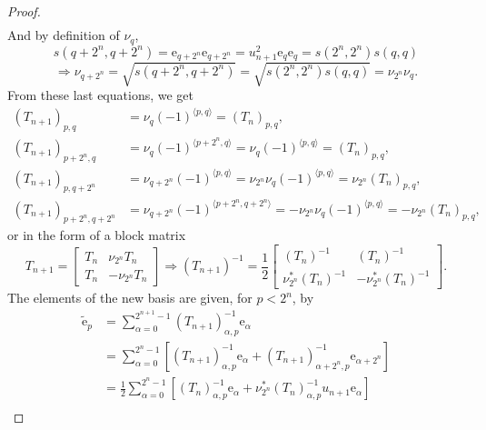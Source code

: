 \documentclass[10pt,a4paper]{amsart}
\begin{document}
\begin{proof}
\begin{equation}
\begin{aligned}
        \end{aligned}
    \end{equation}
    And by definition of $\nu_q$,
    $$ s(q+2^n, q+2^n) = \mathrm e_{q+2^n} \mathrm e_{q+2^n} = u_{n+1}^2 \mathrm e_q \mathrm e_q = s(2^n, 2^n) s(q,q) $$
    \begin{equation}
        \label{multiperplex and multicomplex diagonal basis theorem : elements nu}
        \Rightarrow \nu_{q+2^n} = \sqrt{s(q+2^n, q+2^n)} = \sqrt{s(2^n, 2^n) s(q,q)} = \nu_{2^n} \nu_q.
    \end{equation}
    From these last equations, we get
    $$
        \begin{aligned}
            (T_{n+1})_{p,q} &= \nu_q (-1)^{\langle p,q\rangle} = (T_n)_{p,q},\\
            (T_{n+1})_{p+2^n,q} &= \nu_q (-1)^{\langle p+2^n,q\rangle} = \nu_q (-1)^{\langle p,q\rangle} = (T_n)_{p,q},\\
            (T_{n+1})_{p,q+2^n} &= \nu_{q+2^n} (-1)^{\langle p,q\rangle} = \nu_{2^n}\nu_q (-1)^{\langle p,q\rangle} = \nu_{2^n}(T_n)_{p,q},\\
            (T_{n+1})_{p+2^n,q+2^n} &= \nu_{q+2^n} (-1)^{\langle p+2^n,q+2^n\rangle} = -\nu_{2^n}\nu_q (-1)^{\langle p,q\rangle} = -\nu_{2^n}(T_n)_{p,q},
        \end{aligned}
    $$
    or in the form of a block matrix
    \begin{equation}
        T_{n+1} = \begin{bmatrix}
            T_n & \nu_{2^n} T_n\\
            T_n & - \nu_{2^n} T_n
        \end{bmatrix} \Rightarrow (T_{n+1})^{-1} = \frac{1}{2} \begin{bmatrix}
            (T_n)^{-1} & (T_n)^{-1}\\
            \nu^*_{2^n} (T_n)^{-1} & - \nu^*_{2^n} (T_n)^{-1}
        \end{bmatrix}.
    \end{equation}
    The elements of the new basis are given, for $p<2^n$, by
    $$ \begin{aligned}
        \tilde{\mathrm e}_p &= \sum_{\alpha=0}^{2^{n+1}-1} (T_{n+1})^{-1}_{\alpha,p} \mathrm e_\alpha\\
        &= \sum_{\alpha=0}^{2^n-1} \left[ (T_{n+1})^{-1}_{\alpha,p} \mathrm e_\alpha+ (T_{n+1})^{-1}_{\alpha+2^n,p} \mathrm e_{\alpha+2^n} \right]\\
        &= \frac{1}{2} \sum_{\alpha=0}^{2^n-1} \left[ (T_{n})^{-1}_{\alpha,p} \mathrm e_\alpha+ \nu_{2^n}^* (T_{n})^{-1}_{\alpha,p} u_{n+1}\mathrm e_{\alpha} \right]\\

\end{aligned}$$
\end{proof}
\end{document}
